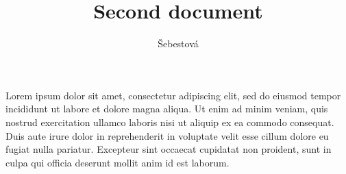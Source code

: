 \documentclass[a4paper, czech]{article}
\title{Second document}
\author{Šebestová}
\begin{document}
\maketitle

Lorem ipsum dolor sit amet, consectetur adipiscing elit, sed do eiusmod tempor incididunt ut labore et dolore magna aliqua.
Ut enim ad minim veniam, quis nostrud exercitation ullamco laboris nisi ut aliquip ex ea commodo consequat.
Duis aute irure dolor in reprehenderit in voluptate velit esse cillum dolore eu fugiat nulla pariatur.
Excepteur sint occaecat cupidatat non proident, sunt in culpa qui officia deserunt mollit anim id est laborum.
\end{document}
